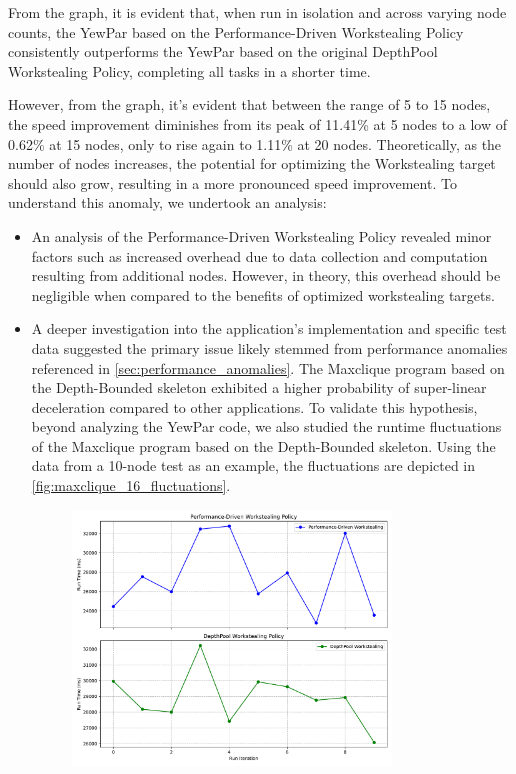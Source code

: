 \documentclass{mproj}
\begin{document}
From the graph, it is evident that, when run in isolation and across varying node counts,
the YewPar based on the Performance-Driven Workstealing Policy consistently outperforms the YewPar based on the original DepthPool Workstealing Policy,
completing all tasks in a shorter time.

However, from the graph, it's evident that between the range of 5 to 15 nodes,
the speed improvement diminishes from its peak of 11.41\% at 5 nodes to a low of 0.62\% at 15 nodes,
only to rise again to 1.11\% at 20 nodes.
Theoretically, as the number of nodes increases,
the potential for optimizing the Workstealing target should also grow,
resulting in a more pronounced speed improvement.
To understand this anomaly, we undertook an analysis:
\begin{itemize}
    \item An analysis of the Performance-Driven Workstealing Policy revealed minor factors such as increased overhead due to data collection and computation resulting from additional nodes.
          However, in theory, this overhead should be negligible when compared to the benefits of optimized workstealing targets.
    \item A deeper investigation into the application's implementation and specific test data suggested the primary issue likely stemmed from performance anomalies referenced in \ref{sec:performance_anomalies}.
          The Maxclique program based on the Depth-Bounded skeleton exhibited a higher probability of super-linear deceleration compared to other applications.
          To validate this hypothesis, beyond analyzing the YewPar code,
          we also studied the runtime fluctuations of the Maxclique program based on the Depth-Bounded skeleton.
          Using the data from a 10-node test as an example, the fluctuations are depicted in \cref{fig:maxclique_16_fluctuations}.
          \begin{figure}[h]
              \centering
              \includegraphics[width=0.8\textwidth]{images/maxclique_16_fluctuations.pdf}

\end{figure}
\end{itemize}
\end{document}
